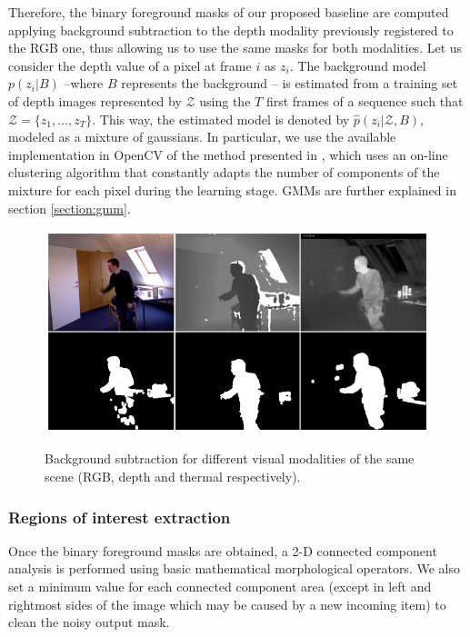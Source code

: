 \documentclass[10pt,twocolumn,letterpaper]{article}
\begin{document}
Therefore, the binary foreground masks of our proposed baseline are computed applying background subtraction to the depth modality previously registered to the RGB one, thus allowing us to use the same masks for both modalities.  Let us consider the depth value of a pixel at frame $i$ as $z_i$. The background model $p(z_i|B)$ --where $B$ represents the background -- is estimated from a training set of depth images represented by $\mathcal{Z}$ using the $T$ first frames of a sequence such that $\mathcal{Z} = \{z_1, \ldots, z_T\}$. This way, the estimated model is denoted by $\hat{p}(z_i| \mathcal{Z}, B)$, modeled as a mixture of gaussians. In particular, we use the available implementation in OpenCV of the method presented in \cite{zivkovic2004improved}, which uses an on-line clustering algorithm that constantly adapts the number of components of the mixture for each pixel during the learning stage. GMMs are further explained in section \ref{section:gmm}.

 \begin{figure}[!h]
{\includegraphics[width=\linewidth]{bs.eps}}
\caption{Background subtraction for different visual
modalities of the same scene (RGB, depth and thermal respectively).
\label{fig:bscomparison}}
\end{figure}

\subsubsection{Regions of interest extraction}
\label{sssec:extreg}
Once the binary foreground masks are obtained, a 2-D connected component analysis is performed using basic mathematical morphological operators. We also set a minimum value for each connected component area (except in left and rightmost sides of the image which may be caused by a new incoming item) to clean the noisy output mask. 
\end{document}
